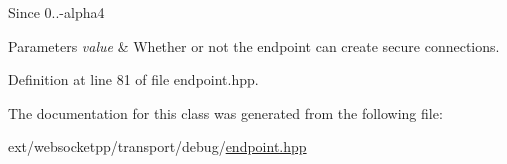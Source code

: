 \begin{DoxySince}{Since}
0..-\/alpha4
\end{DoxySince}

\begin{DoxyParams}{Parameters}
{\em value} & Whether or not the endpoint can create secure connections. \\
\hline
\end{DoxyParams}


Definition at line 81 of file endpoint.\+hpp.



The documentation for this class was generated from the following file\+:\begin{DoxyCompactItemize}
\item 
ext/websocketpp/transport/debug/\hyperlink{websocketpp_2transport_2debug_2endpoint_8hpp}{endpoint.\+hpp}\end{DoxyCompactItemize}
